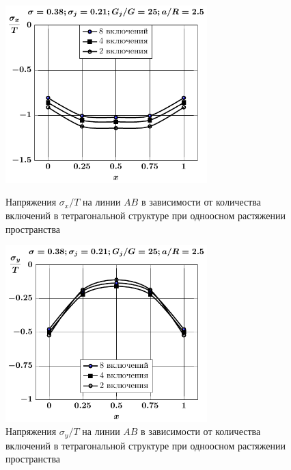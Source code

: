 \begin{figure}[h!]
\centering\footnotesize
\parbox[b]{7.5cm}{\centering\includegraphics[width=7.8cm]{inc8-4-2-a25-d95-g25-sig_x-spheres-tension1.pdf}
\caption{Напряжения $\sigma_x/T$ на линии  $AB$ в зависимости от количества включений в тетрагональной структуре при одноосном растяжении пространства
\label{f:8:18}}}\hfil\hfil
\parbox[b]{7.5cm}{\centering\includegraphics[width=7.8cm]{inc8-4-2-a25-d95-g25-sig_y-spheres-tension1.pdf}
\caption{Напряжения $\sigma_y/T$ на линии  $AB$ в зависимости от количества включений в тетрагональной структуре при одноосном растяжении пространства
\label{f:8:19}}}
\end{figure}

%

